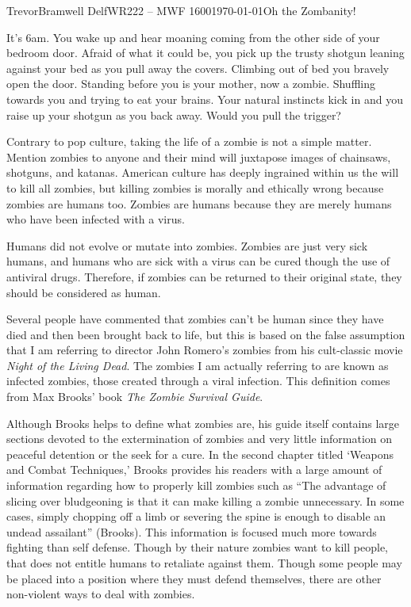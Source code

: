 \documentclass[12pt,letterpaper]{article}
\begin{document}
\begin{mla}{Trevor}{Bramwell}
{Delf}{WR222 -- MWF 1600}{\today}{Oh the Zombanity!}

It's 6am. You wake up and hear moaning coming from the other side of your
bedroom door. Afraid of what it could be, you pick up the trusty shotgun
leaning against your bed as you pull away the covers. Climbing out of bed
you bravely open the door. Standing before you is your mother, now a zombie.
Shuffling towards you and trying to eat your brains. Your natural instincts
kick in and you raise up your shotgun as you back away.
Would you pull the trigger?

Contrary to pop culture, taking the life of a zombie is not a simple matter.
Mention zombies to anyone and their mind will juxtapose images of
chainsaws, shotguns, and katanas. American culture has deeply ingrained within
us the will to kill all zombies, but killing zombies is morally and ethically
wrong because zombies are humans too.\label{thesis}
Zombies are humans because they are merely humans who have been infected with
a virus.

Humans did not evolve or mutate into zombies. 
Zombies are just very sick humans, and humans who are sick with a virus can
be cured though the use of antiviral drugs. Therefore, if zombies can be returned
to their original state, they should be considered as human.

Several people have commented that zombies can't be human since they
have died and then been brought back to life, but this is based on the false
assumption that I am referring to director John Romero's zombies from his
cult-classic movie \emph{Night of the Living Dead}. The zombies I am actually
referring to are known as infected zombies, those created through a viral
infection. This definition comes from Max Brooks' book
\emph{The Zombie Survival Guide}. 

Although Brooks helps to define what
zombies are, his guide itself contains large sections
devoted to the extermination of zombies and very little information on peaceful
detention or the seek for a cure.
In the second chapter titled `Weapons and Combat Techniques,'
Brooks provides his readers with a large amount of
information regarding how to properly kill zombies such as
``The advantage of slicing over bludgeoning is that
it can make killing a zombie unnecessary. In some cases, simply chopping off a
limb or severing the spine is enough to disable an undead assailant'' (Brooks).
This information is focused much more towards fighting than self defense.
Though by their nature zombies want to kill people, that does not entitle
humans to retaliate against them. Though some people may be placed into a
position where they must defend themselves, there are other non-violent ways
to deal with zombies.


\end{mla}
\end{document}
